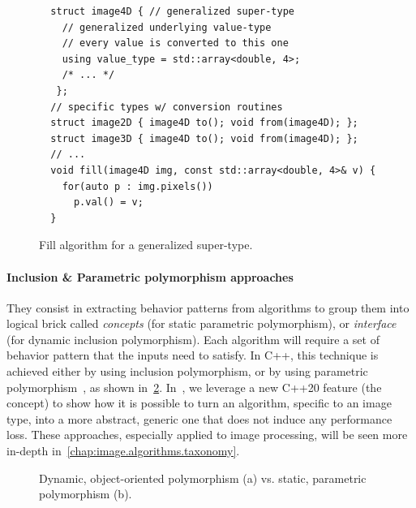 \begin{figure}[htbp]
  \centering
  \begin{verbatim}
  struct image4D { // generalized super-type
    // generalized underlying value-type
    // every value is converted to this one
    using value_type = std::array<double, 4>;
    /* ... */
   };
  // specific types w/ conversion routines
  struct image2D { image4D to(); void from(image4D); };
  struct image3D { image4D to(); void from(image4D); };
  // ...
  void fill(image4D img, const std::array<double, 4>& v) {
    for(auto p : img.pixels())
      p.val() = v;
  }
  \end{verbatim}
  \caption{Fill algorithm for a generalized super-type.}
  \label{code:gen.generalized}
\end{figure}

\paragraph{Inclusion \& Parametric polymorphism approaches} They consist in extracting behavior patterns from algorithms
to group them into logical brick called \emph{concepts} (for static parametric polymorphism), or \emph{interface} (for
dynamic inclusion polymorphism). Each algorithm will require a set of behavior pattern that the inputs need to satisfy.
In C++, this technique is achieved either by using inclusion polymorphism, or by using parametric
polymorphism~\parencite{gibbons.2007.datatype}, as shown in~\cref{code:gen.inclupoly}. In~\parencite{roynard.2019.rrpr},
we leverage a new C++20 feature (the concept) to show how it is possible to turn an algorithm, specific to an image
type, into a more abstract, generic one that does not induce any performance loss. These approaches, especially applied
to image processing, will be seen more in-depth in~\cref{chap:image.algorithms.taxonomy}.

\begin{figure}[htb]
  \centering
  \hfil
  \vfil
  \hfil
  \caption{Dynamic, object-oriented polymorphism (a) vs. static, parametric polymorphism (b).}
  \label{code:gen.inclupoly}
\end{figure}

